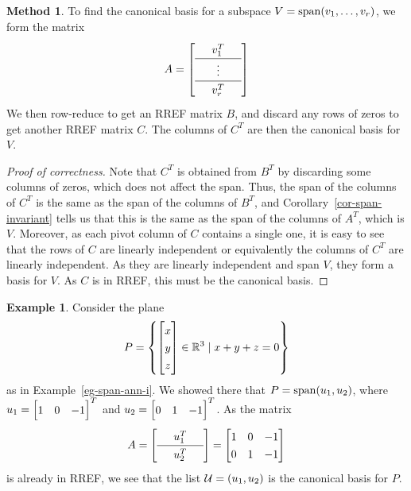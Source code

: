 \documentclass[reqno]{amsart}
\theoremstyle{definition}
\newtheorem{example}[theorem]{Example}
\newtheorem{method}[theorem]{Method}
\begin{document}
\begin{method}\label{meth-span-canonical}
 To find the canonical basis for a subspace $V=\operatorname{span}(v_1,\dotsc,v_r)$,
 we form the matrix
 \[ \renewcommand{\arraystretch}{1.3}
    A = \left[\begin{array}{ccc}
         & v_1^T & \\ \hline
         & \vdots & \\ \hline
         & v_r^T &
        \end{array}\right]
 \]
 We then row-reduce to get an RREF matrix $B$, and discard any rows of
 zeros to get another RREF matrix $C$.  The columns of $C^T$ are then
 the canonical basis for $V$.
\end{method}

\begin{proof}[Proof of correctness]
 Note that $C^T$ is obtained from $B^T$ by discarding some columns of
 zeros, which does not affect the span.  Thus, the span of the columns
 of $C^T$ is the same as the span of the columns of $B^T$, and
 Corollary~\ref{cor-span-invariant} tells us that this is the same as
 the span of the columns of $A^T$, which is $V$.  Moreover, as each
 pivot column of $C$ contains a single one, it is easy to see that the
 rows of $C$ are linearly independent or equivalently the columns of
 $C^T$ are linearly independent.  As they are linearly independent and
 span $V$, they form a basis for $V$.  As $C$ is in RREF, this must be
 the canonical basis.
\end{proof}

\begin{example}\label{eg-span-ann-i-canonical}
 Consider the plane
 \[ P = \left\{\bbm x\\ y\\ z\ebm \in\R^3\st x+y+z= 0\right\}  \]
 as in Example~\ref{eg-span-ann-i}.  We showed there that
 $P=\operatorname{span}(u_1,u_2)$, where $u_1=\bbm 1&0&-1\ebm^T$ and
 $u_2=\bbm 0&1&-1\ebm^T$.  As the matrix
 \[ A = {\renewcommand{\arraystretch}{1.3}
        \left[\begin{array}{ccc}
         & u_1^T & \\ \hline
         & u_2^T &
        \end{array}\right]}
      = \bbm 1 & 0 & -1 \\ 0 & 1 & -1 \ebm
 \]
 is already in RREF, we see that the list $\mathcal{U}=(u_1,u_2)$ is the
 canonical basis for $P$.
\end{example}
\end{document}
